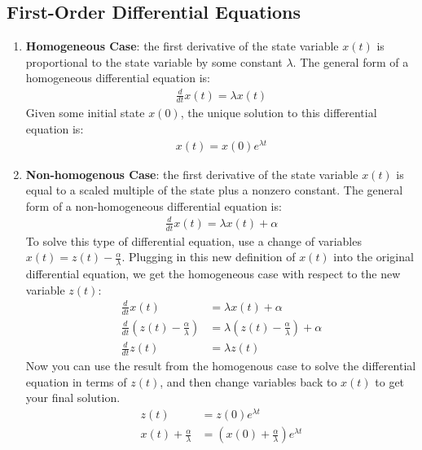 \subsection*{First-Order Differential Equations}
\begin{enumerate}
    \item \textbf{Homogeneous Case}: the first derivative of the state variable $x(t)$ is proportional to the state variable by some constant $\lambda$. The general form of a homogeneous differential equation is:
    \begin{align*}
        \boxed{\frac{d}{dt} x(t) = \lambda x(t)}
    \end{align*}
    Given some initial state $x(0)$, the unique solution to this differential equation is:
    \begin{align*}
        \boxed{x(t) = x(0) e^{\lambda t}}
    \end{align*}

    \item \textbf{Non-homogenous Case}: the first derivative of the state variable $x(t)$ is equal to a scaled multiple of the state plus a nonzero constant. The general form of a non-homogeneous differential equation is:
    \begin{align*}
        \boxed{\frac{d}{dt} x(t) = \lambda x(t) + \alpha}
    \end{align*}
    To solve this type of differential equation, use a change of variables $x(t) = z(t) - \frac{\alpha}{\lambda}$. Plugging in this new definition of $x(t)$ into the original differential equation, we get the homogeneous case with respect to the new variable $z(t)$:
    \begin{align*}
        \frac{d}{dt} x(t) &= \lambda x(t) + \alpha \\
        \frac{d}{dt} (z(t) - \frac{\alpha}{\lambda}) &= \lambda (z(t) - \frac{\alpha}{\lambda}) + \alpha \\
        \frac{d}{dt} z(t) &= \lambda z(t)
    \end{align*}
    Now you can use the result from the homogenous case to solve the differential equation in terms of $z(t)$, and then change variables back to $x(t)$ to get your final solution.
    \begin{align*}
        z(t) &= z(0) e^{\lambda t} \\
        x(t) + \frac{\alpha}{\lambda} &= (x(0) + \frac{\alpha}{\lambda}) e^{\lambda t} \\
    \end{align*}


\end{enumerate}
